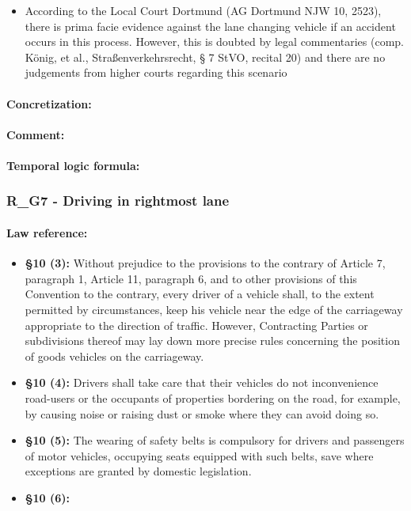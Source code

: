 \begin{itemize}
	\item According to the Local Court Dortmund (AG Dortmund NJW 10, 2523), there is prima facie
	evidence against the lane changing vehicle if an accident occurs in this process. However, this
	is doubted by legal commentaries (comp. König, et al., Straßenverkehrsrecht, § 7 StVO,
	recital 20) and there are no judgements from higher courts regarding this scenario
\end{itemize}

\paragraph{Concretization:}

\paragraph{Comment:}

\paragraph{Temporal logic formula:}

\subsubsection{R\_G7 - Driving in rightmost lane}
\paragraph{Law reference:}

\begin{itemize}
	\item \textbf{\vcort \S 10 (3):} Without prejudice to the provisions to the contrary of Article 7, paragraph 1, Article 11,
	paragraph 6, and to other provisions of this Convention to the contrary, every driver of a vehicle
	shall, to the extent permitted by circumstances, keep his vehicle near the edge of the carriageway
	appropriate to the direction of traffic. However, Contracting Parties or subdivisions thereof may
	lay down more precise rules concerning the position of goods vehicles on the carriageway.
	
	\item \textbf{\vcort \S 10 (4):} Drivers shall take care that their vehicles do not inconvenience road-users or the occupants
	of properties bordering on the road, for example, by causing noise or raising dust or smoke where
	they can avoid doing so.
	
	\item \textbf{\vcort \S 10 (5):} The wearing of safety belts is compulsory for drivers and passengers of motor vehicles,
	occupying seats equipped with such belts, save where exceptions are granted by domestic
	legislation.
	
	\item \textbf{\vcort \S 10 (6):}
\end{itemize}

